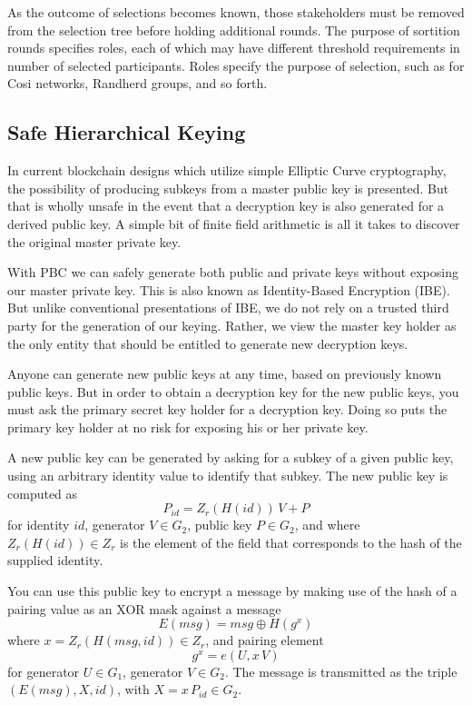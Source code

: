 \documentclass{yellowpaper}
\begin{document}
As the outcome of selections becomes known, those stakeholders must be removed from the selection tree before holding additional rounds. The purpose of sortition rounds specifies roles, each of which may have different threshold requirements in number of selected participants. Roles specify the purpose of selection, such as for Cosi networks, Randherd groups, and so forth.


\subsection{Safe Hierarchical Keying}

In current blockchain designs which utilize simple Elliptic Curve cryptography, the possibility of producing subkeys from a master public key is presented. But that is wholly unsafe in the event that a decryption key is also generated for a derived public key. A simple bit of finite field arithmetic is all it takes to discover the original master private key.

With PBC we can safely generate both public and private keys without exposing our master private key. This is also known as Identity-Based Encryption (IBE). But unlike conventional presentations of IBE, we do not rely on a trusted third party for the generation of our keying. Rather, we view the master key holder as the only entity that should be entitled to generate new decryption keys. 

Anyone can generate new public keys at any time, based on previously known public keys.
But in order to obtain a decryption key for the new public keys, you must ask the primary secret key holder for a decryption key. Doing so puts the primary key holder at no risk for exposing his or her private key.

A new public key can be generated by asking for a subkey of a given public key, using an arbitrary identity value to identify that subkey. The new public key is computed as 
$$ P_{id} = Z_r(H(id)) \, V + P$$ 
for identity $id$, generator $V \in G_2$, public key $P \in G_2$, and where $Z_r(H(id)) \in Z_r$ is the element of the field that corresponds to the hash of the supplied identity. 

You can use this public key to encrypt a message by making use of the hash of a pairing value as an XOR mask against a message $$E(msg) = msg \oplus H(g^x)$$ where $x = Z_r(H(msg, id)) \in Z_r$, and pairing element 
$$g^x = e(U, x \, V)$$
for generator $U \in G_1$, generator $V \in G_2$. The message is transmitted as the triple $(E(msg), X, id)$, with $X = x \, P_{id} \in G_2$.
\end{document}
